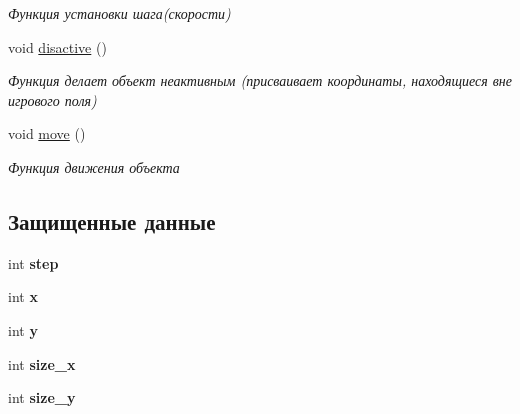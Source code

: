 \begin{DoxyCompactItemize}
\begin{DoxyCompactList}\small\item\em Функция установки шага(скорости) \end{DoxyCompactList}\item 
\mbox{\label{classbase__object_a87c6fdcdcca46c1839d0bf7fae110574}} 
void \mbox{\hyperlink{classbase__object_a87c6fdcdcca46c1839d0bf7fae110574}{disactive}} ()
\begin{DoxyCompactList}\small\item\em Функция делает объект неактивным (присваивает координаты, находящиеся вне игрового поля) \end{DoxyCompactList}\item 
\mbox{\label{classbase__object_ae472a40a19f6419fca4aa35c91d48542}} 
void \mbox{\hyperlink{classbase__object_ae472a40a19f6419fca4aa35c91d48542}{move}} ()
\begin{DoxyCompactList}\small\item\em Функция движения объекта \end{DoxyCompactList}\end{DoxyCompactItemize}
\subsection*{Защищенные данные}
\begin{DoxyCompactItemize}
\item 
\mbox{\label{classbase__object_a36f88ce36cd068418e1118768a2141b3}} 
int {\bfseries step}
\item 
\mbox{\label{classbase__object_a9e2761b4dfa644652ea475618533ff83}} 
int {\bfseries x}
\item 
\mbox{\label{classbase__object_ab9e8870a1b0d42c556c69ab9a564a4cf}} 
int {\bfseries y}
\item 
\mbox{\label{classbase__object_a554c6a9d999cf59daed4a5abdef14395}} 
int {\bfseries size\+\_\+x}
\item 
\mbox{\label{classbase__object_a481776fb475d298bf7e9012568f16a2e}} 
int {\bfseries size\+\_\+y}
\end{DoxyCompactItemize}
